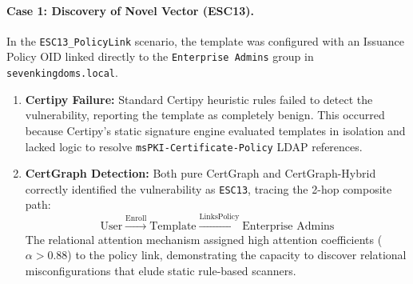 \paragraph{Case 1: Discovery of Novel Vector (ESC13).}
In the \texttt{ESC13\_PolicyLink} scenario, the template was configured with an Issuance Policy OID linked directly to the \texttt{Enterprise Admins} group in \nolinkurl{sevenkingdoms.local}. 
\begin{enumerate}
    \item \textbf{Certipy Failure:} Standard Certipy heuristic rules failed to detect the vulnerability, reporting the template as completely benign. This occurred because Certipy's static signature engine evaluated templates in isolation and lacked logic to resolve \texttt{msPKI-}\allowbreak\texttt{Certificate-}\allowbreak\texttt{Policy} LDAP references.
    \item \textbf{CertGraph Detection:} Both pure CertGraph and CertGraph-Hybrid correctly identified the vulnerability as \texttt{ESC13}, tracing the 2-hop composite path:
    \begin{equation}
    \text{User} \xrightarrow{\text{Enroll}} \text{Template} \xrightarrow{\text{LinksPolicy}} \text{Enterprise Admins}
    \end{equation}
    The relational attention mechanism assigned high attention coefficients ($\alpha > 0.88$) to the policy link, demonstrating the capacity to discover relational misconfigurations that elude static rule-based scanners.
\end{enumerate}

